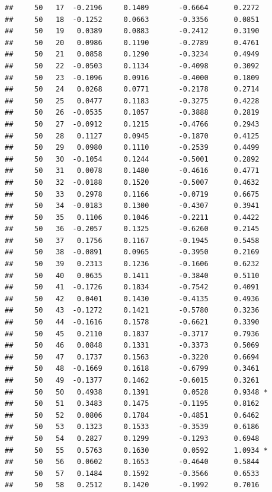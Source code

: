 \documentclass[
]{article}
\begin{document}
\begin{verbatim}
##     50   17  -0.2196     0.1409       -0.6664      0.2272  
##     50   18  -0.1252     0.0663       -0.3356      0.0851  
##     50   19   0.0389     0.0883       -0.2412      0.3190  
##     50   20   0.0986     0.1190       -0.2789      0.4761  
##     50   21   0.0858     0.1290       -0.3234      0.4949  
##     50   22  -0.0503     0.1134       -0.4098      0.3092  
##     50   23  -0.1096     0.0916       -0.4000      0.1809  
##     50   24   0.0268     0.0771       -0.2178      0.2714  
##     50   25   0.0477     0.1183       -0.3275      0.4228  
##     50   26  -0.0535     0.1057       -0.3888      0.2819  
##     50   27  -0.0912     0.1215       -0.4766      0.2943  
##     50   28   0.1127     0.0945       -0.1870      0.4125  
##     50   29   0.0980     0.1110       -0.2539      0.4499  
##     50   30  -0.1054     0.1244       -0.5001      0.2892  
##     50   31   0.0078     0.1480       -0.4616      0.4771  
##     50   32  -0.0188     0.1520       -0.5007      0.4632  
##     50   33   0.2978     0.1166       -0.0719      0.6675  
##     50   34  -0.0183     0.1300       -0.4307      0.3941  
##     50   35   0.1106     0.1046       -0.2211      0.4422  
##     50   36  -0.2057     0.1325       -0.6260      0.2145  
##     50   37   0.1756     0.1167       -0.1945      0.5458  
##     50   38  -0.0891     0.0965       -0.3950      0.2169  
##     50   39   0.2313     0.1236       -0.1606      0.6232  
##     50   40   0.0635     0.1411       -0.3840      0.5110  
##     50   41  -0.1726     0.1834       -0.7542      0.4091  
##     50   42   0.0401     0.1430       -0.4135      0.4936  
##     50   43  -0.1272     0.1421       -0.5780      0.3236  
##     50   44  -0.1616     0.1578       -0.6621      0.3390  
##     50   45   0.2110     0.1837       -0.3717      0.7936  
##     50   46   0.0848     0.1331       -0.3373      0.5069  
##     50   47   0.1737     0.1563       -0.3220      0.6694  
##     50   48  -0.1669     0.1618       -0.6799      0.3461  
##     50   49  -0.1377     0.1462       -0.6015      0.3261  
##     50   50   0.4938     0.1391        0.0528      0.9348 *
##     50   51   0.3483     0.1475       -0.1195      0.8162  
##     50   52   0.0806     0.1784       -0.4851      0.6462  
##     50   53   0.1323     0.1533       -0.3539      0.6186  
##     50   54   0.2827     0.1299       -0.1293      0.6948  
##     50   55   0.5763     0.1630        0.0592      1.0934 *
##     50   56   0.0602     0.1653       -0.4640      0.5844  
##     50   57   0.1484     0.1592       -0.3566      0.6533  
##     50   58   0.2512     0.1420       -0.1992      0.7016  

\end{verbatim}
\end{document}
